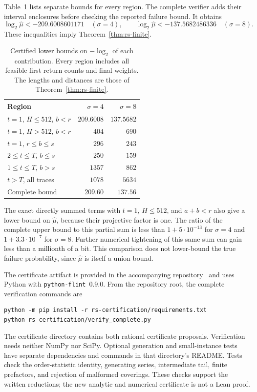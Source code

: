 Table~\ref{tab:rs-certificate} lists separate bounds for every region.
The complete verifier adds their interval enclosures before checking the
reported failure bound.  It obtains
\[
 \log_2\widehat\mu < -209.6008601171\quad(\sigma=4),\qquad
 \log_2\widehat\mu < -137.5682486336\quad(\sigma=8).
\]
These inequalities imply Theorem~\ref{thm:rs-finite}.

\begin{table}[ht]
\centering
\small
\begin{tabular}{@{}l@{\qquad}r@{\quad}r@{}}
\toprule
Region & $\sigma=4$ & $\sigma=8$\\
\midrule
$t=1$, $H\le512$, $b<r$ & $209.6008$ & $137.5682$\\
$t=1$, $H>512$, $b<r$ & $404$ & $690$\\
$t=1$, $r\le b\le s$ & $296$ & $243$\\
$2\le t\le T$, $b\le s$ & $250$ & $159$\\
$1\le t\le T$, $b>s$ & $1357$ & $862$\\
$t>T$, all traces & $1078$ & $5634$\\
\midrule
Complete bound & $209.60$ & $137.56$\\
\bottomrule
\end{tabular}
\caption{Certified lower bounds on $-\log_2$ of each contribution.
Every region includes all feasible first return counts and final weights.
The lengths and distances are those of Theorem~\ref{thm:rs-finite}.}
\label{tab:rs-certificate}
\end{table}

The exact directly summed terms with $t=1$, $H\le512$, and $a+b<r$ also
give a lower bound on $\widehat\mu$, because their projective factor is one.
The ratio of the complete upper bound to this partial sum is less than
$1+5\cdot10^{-13}$ for $\sigma=4$ and $1+3.3\cdot10^{-7}$ for $\sigma=8$.
Further numerical tightening of this same sum can gain less than a
millionth of a bit.  This comparison does not lower-bound the true failure
probability, since $\widehat\mu$ is itself a union bound.

The certificate artifact is provided in the accompanying
repository~\cite{chosenbaaartifact} and uses Python with
\texttt{python-flint}~0.9.0.  From the repository root, the complete
verification commands are
\begin{verbatim}
python -m pip install -r rs-certification/requirements.txt
python rs-certification/verify_complete.py
\end{verbatim}
The certificate directory contains both rational certificate proposals.
Verification needs neither NumPy nor SciPy.  Optional generation and
small-instance tests have separate dependencies and commands in that
directory's README.  Tests check the order-statistic identity, generating
series, intermediate tail, finite prefactors, and rejection of malformed
coverings.  These checks support the written reductions; the new analytic
and numerical certificate is not a Lean proof.
